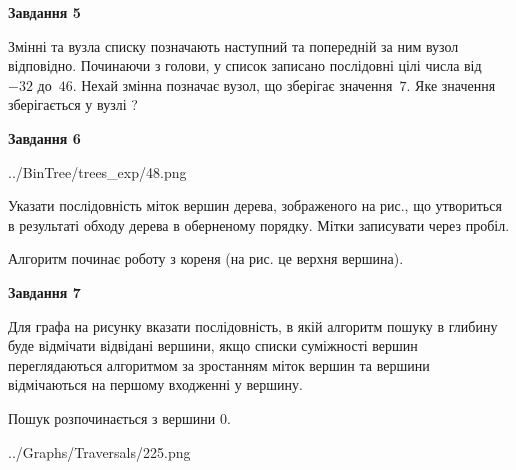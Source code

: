 \documentclass[12pt, ukrainian]{article}
\begin{document}
{\begin {large}
{\begin {center}\textbf{Завдання 5}\end {center}}\par
Змінні  та  вузла списку позначають наступний та попередній за ним вузол відповідно. Починаючи з голови, у список записано послідовні цілі числа від~$-32$ до~$46$. Нехай змінна  позначає вузол, що зберігає значення~$7$.
Яке значення зберігається у вузлі  ?\par
\newpage

{\begin {center}\textbf{Завдання 6}\end {center}}\par

\begin{center}
	{../BinTree/trees_exp/48.png}
\end{center}
Указати послідовність міток вершин дерева, зображеного на рис., що утвориться в результаті обходу дерева в оберненому порядку. Мітки записувати через пробіл.\par Алгоритм починає роботу з кореня (на рис. це верхня вершина).\par
\newpage

{\begin {center}\textbf{Завдання 7}\end {center}}\par
Для графа на рисунку вказати послідовність, в якій алгоритм пошуку в глибину буде відмічати відвідані вершини, якщо списки суміжності вершин переглядаються алгоритмом за зростанням міток вершин та вершини відмічаються на першому вход\-женні у вершину.\par
Пошук розпочинається з вершини 0.\par

\begin{center}
	{../Graphs/Traversals/225.png}
\end{center}\par
\newpage


\end{large}}
\end{document}
